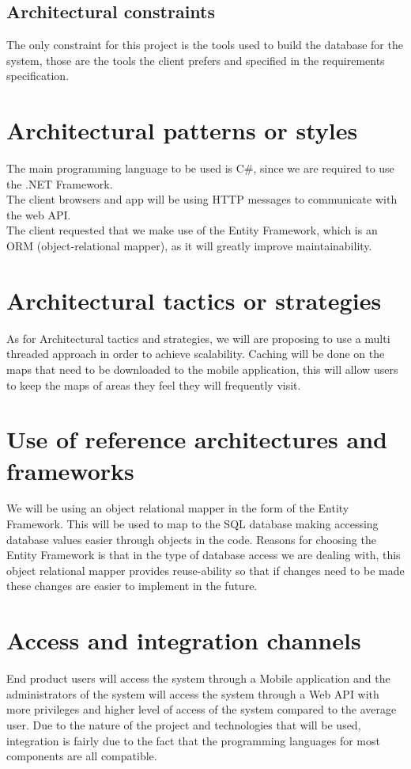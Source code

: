 \documentclass[11pt,titlepage]{article} %
\begin{document}
\subsection{Architectural constraints}
The only constraint for this project is the tools used to build the database for the system, those are the tools the client prefers and specified in the requirements specification.

\section{Architectural patterns or styles}
The main programming language to be used is C\#, since we are required to use the .NET Framework.\\
The client browsers and app will be using HTTP messages to communicate with the web API.\\
The client requested that we make use of the Entity Framework, which is an ORM (object-relational mapper), as it will greatly improve maintainability.

\section{Architectural tactics or strategies}
As for Architectural tactics and strategies, we will are proposing to use a multi threaded approach in order to achieve scalability. Caching will be done on the maps that need to be downloaded to the mobile application, this will allow users to keep the maps of areas they feel they will frequently visit. 

\section{Use of reference architectures and frameworks}
We will be using an object relational mapper in the form of the Entity Framework. This will be used to map to the SQL database making accessing database values easier through objects in the code. Reasons for choosing the Entity Framework is that in the type of database access we are dealing with, this object relational mapper provides reuse-ability so that if changes need to be made these changes are easier to implement in the future. 

\section{Access and integration channels}
End product users will access the system through a Mobile application and the administrators of the system will access the system through a Web API with more privileges and higher level of access of the system compared to the average user. Due to the nature of the project and technologies that will be used, integration is fairly due to the fact that the programming languages for most components are all compatible.
\end{document}

